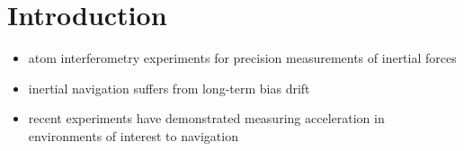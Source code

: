 \chapter{Introduction}\label{chap:intro}
\begin{itemize}
    \item atom interferometry experiments for precision measurements of inertial forces
    \item inertial navigation suffers from long-term bias drift
    \item recent experiments have demonstrated measuring acceleration in environments of interest to navigation
\end{itemize}



